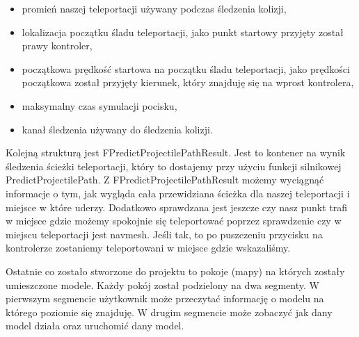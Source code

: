 \documentclass[a4paper,12pt,reqno]{article}
\begin{document}
\begin{itemize}
\item promień naszej teleportacji używany podczas śledzenia kolizji,
\item lokalizacja początku śladu teleportacji, jako punkt startowy przyjęty został prawy kontroler,
\item początkowa prędkość startowa na początku śladu teleportacji, jako prędkości początkowa został przyjęty kierunek, który znajduję się na wprost kontrolera,
\item maksymalny czas symulacji pocisku,
\item kanał śledzenia używany do śledzenia kolizji.
\end{itemize}

Kolejną strukturą jest FPredictProjectilePathResult. Jest to kontener na wynik śledzenia ścieżki teleportacji, który to dostajemy przy użyciu funkcji silnikowej PredictProjectilePath. Z FPredictProjectilePathResult możemy wyciągnąć informacje o
tym, jak wygląda cała przewidziana ścieżka dla naszej teleportacji i miejsce w które uderzy. Dodatkowo sprawdzana jest jeszcze czy nasz punkt trafi w miejsce gdzie możemy spokojnie się teleportować poprzez sprawdzenie czy w miejscu teleportacji jest navmesh. Jeśli tak, to po puszczeniu przycisku na kontrolerze zostaniemy teleportowani w miejsce gdzie wskazaliśmy.



Ostatnie co zostało stworzone do projektu to pokoje (mapy) na których zostały umieszczone modele. Każdy pokój został podzielony na dwa segmenty. W pierwszym segmencie użytkownik może przeczytać informację o modelu na którego poziomie się znajduję. W drugim segmencie może zobaczyć jak dany model działa oraz uruchomić dany model.
\end{document}
